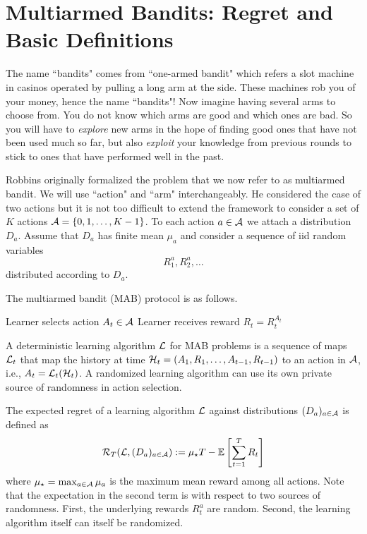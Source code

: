 \documentclass[11pt]{article}
\begin{document}
\section{Multiarmed Bandits: Regret and Basic Definitions}

The name ``bandits" comes from ``one-armed bandit" which refers a slot machine in casinos operated by pulling a long arm at the side. These machines rob you of your money, hence the name ``bandits"!
Now imagine having several arms to choose from. You do not know which arms are good and which ones are bad. So you will have to \emph{explore} new arms in the hope of finding good ones that have not been used much
so far, but also \emph{exploit} your knowledge from previous rounds to stick to ones that have performed well in the past.

Robbins \cite{robbins1952some} originally formalized the problem that we now refer to as multiarmed bandit. We will use ``action" and ``arm" interchangeably. He considered the case of two actions
but it is not too difficult to extend the framework to consider a set of $K$ actions $\mathcal{A} = \{0,1,\ldots,K-1\}$. To each action $a \in \mathcal{A}$ we attach a distribution $D_a$. Assume that $D_a$ has finite mean $\mu_a$ and
consider a sequence of iid random variables
\[
R^a_1,R^a_2,\ldots
\]
distributed according to $D_a$.

The multiarmed bandit (MAB) protocol is as follows.

\begin{algorithmic}[1]
\STATE Learner selects action $A_t \in \mathcal{A}$
\STATE Learner receives reward $R_t = R^{A_t}_t$
\ENDFOR
\end{algorithmic}

A deterministic learning algorithm $\mathcal{L}$ for MAB problems is a sequence of maps $\mathcal{L}_t$ that map the history at time $\mathcal{H}_t = (A_1,R_1,\ldots,A_{t-1},R_{t-1})$ to an action in $\mathcal{A}$, i.e.,
$A_t = \mathcal{L}_t(\mathcal{H}_t)$. A randomized learning algorithm can use its own private source of randomness in action selection.

The expected regret of a learning algorithm $\mathcal{L}$ against distributions $(D_a)_{a \in \mathcal{A}}$ is defined as
\begin{equation}\label{eq:mabregret}
\mathcal{R}_T(\mathcal{L}, (D_a)_{a \in \mathcal{A}}) := \mu_\star T - \mathbb{E}\left[ \sum_{t=1}^T R_t \right]
\end{equation}
where $\mu_\star = \max_{a \in \mathcal{A}} \mu_a$ is the maximum mean reward among all actions. Note that the expectation in the second term is with respect to two sources of randomness.
First, the underlying rewards $R^a_t$ are random. Second, the learning algorithm itself can itself be randomized.
\end{document}

